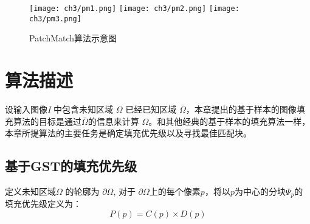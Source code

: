  \begin{figure}[htb]
  \centering%
    {\texttt{[image: ch3/pm1.png]}}%
 \hspace{1em}%
      {\texttt{[image: ch3/pm2.png]}}
 \hspace{1em}
      {\texttt{[image: ch3/pm3.png]}}
  \caption{PatchMatch算法示意图~\cite{Barnes:2009}}
  \label{ch3:fig:patchmatch}
\end{figure}
 \section{算法描述}
 \label{ch3:sec:algorithm}
 设输入图像\emph{I} 中包含未知区域 \(\Omega\) 已经已知区域 \(\overline{\Omega}\)，本章提出的基于样本的图像填充算法的目标是通过\(\overline{\Omega}\)的信息来计算 \(\Omega\)。和其他经典的基于样本的填充算法一样，本章所提算法的主要任务是确定填充优先级以及寻找最佳匹配块。
 \subsection{基于GST的填充优先级}
 \label{sec:sub:GST}

 定义未知区域\(\Omega\) 的轮廓为 \(\partial\Omega\), 对于 \(\partial\Omega\)上的每个像素\(p\)，将以\(p\)为中心的分块\(\Psi_p\)的填充优先级定义为：
 \begin{equation}
    \label{equ:chap3:order}
    P(p)=C(p)\times D(p)
 \end{equation}

